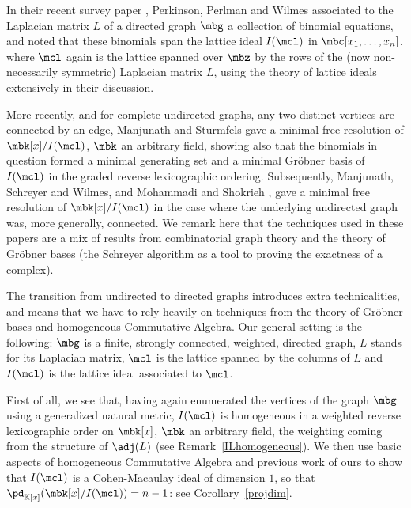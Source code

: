 In their recent survey paper \cite{ppw}, Perkinson, Perlman and Wilmes
associated to the Laplacian matrix $L$ of a directed graph $\mbg$ a
collection of binomial equations, and noted that these binomials span
the lattice ideal $I(\mcl)$ in $\mbc[x_1,\ldots ,x_n]$, where $\mcl$
again is the lattice spanned over $\mbz$ by the rows of the (now
non-necessarily symmetric) Laplacian matrix $L$, using the theory of
lattice ideals extensively in their discussion.

More recently, and for complete undirected graphs, \ie any
two distinct vertices are connected by an edge, Manjunath and
Sturmfels \cite{ms} gave a minimal free resolution of
$\mbk[x]/I(\mcl)$, $\mbk$ an arbitrary field, showing also
that the binomials in question formed a minimal generating set and a
minimal Gr\"obner basis of $I(\mcl)$ in the graded reverse
lexicographic ordering. Subsequently, Manjunath, Schreyer and Wilmes\cite{msw}, and Mohammadi and Shokrieh \cite{mos}, gave a minimal free
resolution of $\mbk[x]/I(\mcl)$ in the case where the underlying
undirected graph was, more generally, connected. We remark here that
the techniques used in these papers are a mix of results from
combinatorial graph theory and the theory of Gr\"obner bases (\eg the
Schreyer algorithm as a tool to proving the exactness of a complex).

The transition from undirected to directed graphs introduces extra
technicalities, and means that we have to rely heavily on techniques
from the theory of Gr\"obner bases and homogeneous Commutative
Algebra. Our general setting is the following: $\mbg$ is a finite,
strongly connected, weighted, directed graph, $L$ stands for its
Laplacian matrix, $\mcl$ is the lattice spanned by the columns of $L$
and $I(\mcl)$ is the lattice ideal associated to $\mcl$.

First of all, we see that, having again enumerated the vertices of the
graph $\mbg$ using a generalized natural metric, $I(\mcl)$ is
homogeneous in a weighted reverse lexicographic order on $\mbk[x]$,
$\mbk$ an arbitrary field, the weighting coming from the structure of
$\adj(L)$ (see Remark~\ref{ILhomogeneous}). We then use basic aspects
of homogeneous Commutative Algebra and previous work of ours to show
that $I(\mcl)$ is a Cohen-Macaulay ideal of dimension $1$, so that
$\pd_{\mathbb{K}[x]}(\mbk[x]/I(\mcl))=n-1$: see
Corollary~\ref{projdim}.

